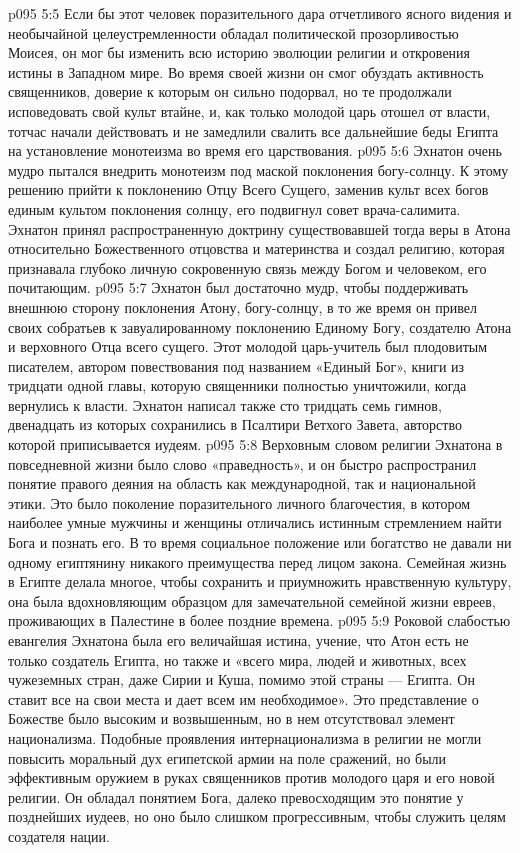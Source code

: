 \vs p095 5:5 Если бы этот человек поразительного дара отчетливого ясного видения и необычайной целеустремленности обладал политической прозорливостью Моисея, он мог бы изменить всю историю эволюции религии и откровения истины в Западном мире. Во время своей жизни он смог обуздать активность священников, доверие к которым он сильно подорвал, но те продолжали исповедовать свой культ втайне, и, как только молодой царь отошел от власти, тотчас начали действовать и не замедлили свалить все дальнейшие беды Египта на установление монотеизма во время его царствования.
\vs p095 5:6 Эхнатон очень мудро пытался внедрить монотеизм под маской поклонения богу\hyp{}солнцу. К этому решению прийти к поклонению Отцу Всего Сущего, заменив культ всех богов единым культом поклонения солнцу, его подвигнул совет врача\hyp{}салимита. Эхнатон принял распространенную доктрину существовавшей тогда веры в Атона относительно Божественного отцовства и материнства и создал религию, которая признавала глубоко личную сокровенную связь между Богом и человеком, его почитающим.
\vs p095 5:7 Эхнатон был достаточно мудр, чтобы поддерживать внешнюю сторону поклонения Атону, богу\hyp{}солнцу, в то же время он привел своих собратьев к завуалированному поклонению Единому Богу, создателю Атона и верховного Отца всего сущего. Этот молодой царь\hyp{}учитель был плодовитым писателем, автором повествования под названием «Единый Бог», книги из тридцати одной главы, которую священники полностью уничтожили, когда вернулись к власти. Эхнатон написал также сто тридцать семь гимнов, двенадцать из которых сохранились в Псалтири Ветхого Завета, авторство которой приписывается иудеям.
\vs p095 5:8 \pc Верховным словом религии Эхнатона в повседневной жизни было слово «праведность», и он быстро распространил понятие правого деяния на область как международной, так и национальной этики. Это было поколение поразительного личного благочестия, в котором наиболее умные мужчины и женщины отличались истинным стремлением найти Бога и познать его. В то время социальное положение или богатство не давали ни одному египтянину никакого преимущества перед лицом закона. Семейная жизнь в Египте делала многое, чтобы сохранить и приумножить нравственную культуру, она была вдохновляющим образцом для замечательной семейной жизни евреев, проживающих в Палестине в более поздние времена.
\vs p095 5:9 Роковой слабостью евангелия Эхнатона была его величайшая истина, учение, что Атон есть не только создатель Египта, но также и «всего мира, людей и животных, всех чужеземных стран, даже Сирии и Куша, помимо этой страны --- Египта. Он ставит все на свои места и дает всем им необходимое». Это представление о Божестве было высоким и возвышенным, но в нем отсутствовал элемент национализма. Подобные проявления интернационализма в религии не могли повысить моральный дух египетской армии на поле сражений, но были эффективным оружием в руках священников против молодого царя и его новой религии. Он обладал понятием Бога, далеко превосходящим это понятие у позднейших иудеев, но оно было слишком прогрессивным, чтобы служить целям создателя нации.
